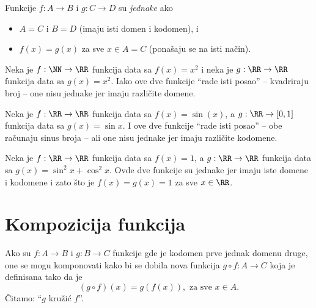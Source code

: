 \clearpage

\noindent
Funkcije $f : A \to B$ i $g : C \to D$ su \emph{jednake} ako
\begin{itemize}\itemsep -1.5pt
\item
  $A = C$ i $B = D$ (imaju isti domen i kodomen), i
\item
  $f(x) = g(x)$ za sve $x \in A = C$ (pona\v saju se na isti na\v cin).
\end{itemize}

\begin{EX}
  Neka je $f : \NN \to \RR$ funkcija data sa $f(x) = x^2$ i neka je $g : \RR \to \RR$ funkcija data sa $g(x) = x^2$.
  Iako ove dve funkcije ``rade isti posao'' -- kvadriraju broj -- one nisu jednake jer imaju razli\v cite domene.
\end{EX}

\begin{EX}
  Neka je $f : \RR \to \RR$ funkcija data sa $f(x) = \sin(x)$, a $g : \RR \to [0,1]$ funkcija data sa $g(x) = \sin x$.
  I ove dve funkcije ``rade isti posao'' -- obe ra\v cunaju sinus broja -- ali one nisu jednake jer imaju razli\v cite kodomene.
\end{EX}

\begin{EX}
  Neka je $f : \RR \to \RR$ funkcija data sa $f(x) = 1$, a $g : \RR \to \RR$ funkcija data sa $g(x) = \sin^2 x + \cos^2 x$.
  Ovde dve funkcije su jednake jer imaju iste domene i kodomene i zato \v sto je $f(x) = g(x) = 1$ za sve $x \in \RR$.
\end{EX}

\section{Kompozicija funkcija}

\noindent
\begin{minipage}{3in}
  \hspace*{1.5em}Ako su $f : A \to B$ i $g : B \to C$ funkcije gde je kodomen prve jednak domenu druge, one se mogu komponovati
  kako bi se dobila nova funkcija\break
  $g \circ f : A \to C$ koja je definisana tako da je
  $$
    (g \circ f)(x) = g(f(x)), \text{\ \ za sve\ \ } x \in A.
  $$
  \v Citamo: ``$g$ kru\v zi\'c $f$''.
\end{minipage}
\hfill
\begin{minipage}{2.5in}
  \begin{center}
    
  \end{center}
\end{minipage}

